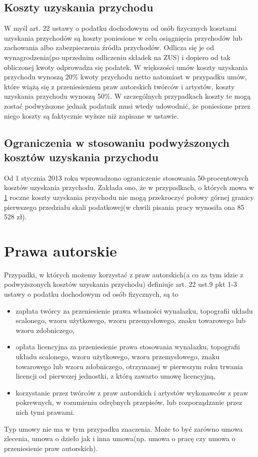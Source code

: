 \subsection[Koszty uzyskania przychodu][Koszty uzyskania przychodu]{Koszty uzyskania przychodu}
W myśl art. 22 ustawy o podatku dochodowym od osób fizycznych\cite{TODO} kosztami uzyskania przychodów są koszty poniesione w celu osiągnięcia przychodów lub zachowania albo zabezpieczenia źródła przychodów. Odlicza się je od wynagrodzenia(po uprzednim odliczeniu składek na ZUS) i dopiero od tak obliczonej kwoty odprowadza się podatek. W większości umów koszty uzyskania przychodu wynoszą 20\% kwoty przychodu netto natomiast w przypadku umów, które wiążą się z przeniesieniem praw autorskich twórców i artystów, koszty uzyskania przychodu wynoszą 50\%. W szczególnych przypadkach koszty te mogą zostać podwyższone jednak podatnik musi wtedy udowodnić, że poniesione przez niego koszty są faktycznie wyższe niż zapisane w ustawie.

\subsection[Ograniczenia w stosowaniu podwyższonych kosztów uzyskania przychodu][Ograniczenia w stosowaniu podwyższonych kosztów uzyskania przychodu]{Ograniczenia w stosowaniu podwyższonych kosztów uzyskania przychodu}
Od 1 stycznia 2013 roku wprowadzono ograniczenie stosowania 50-procentowych kosztów uzyskania przychodu. Zakłada ono, że  w przypadkach, o których mowa w \ref{prawaAutorskie} roczne koszty uzyskania przychodu nie mogą przekroczyć połowy górnej granicy pierwszego przedziału skali podatkowej(w chwili pisania pracy wynosiła ona 85 528 zł).

\section[Prawa autorskie][Prawa autorskie]{Prawa autorskie}
\label{prawaAutorskie}
Przypadki, w których możemy korzystać z praw autorskich(a co za tym idzie z podwyższonych kosztów uzyskania przychodu) definiuje art. 22 ust.9 pkt 1-3 ustawy o podatku dochodowym od osób fizycznych\cite{TODO}, są to
\begin{itemize}
	\item  zapłata twórcy za przeniesienie prawa własności wynalazku, topografii układu scalonego, wzoru użytkowego, wzoru przemysłowego, znaku towarowego lub wzoru zdobniczego,
	\item opłata licencyjna za przeniesienie prawa stosowania wynalazku, topografii układu scalonego, wzoru użytkowego, wzoru przemysłowego, znaku towarowego lub wzoru zdobniczego, otrzymanej w pierwszym roku trwania licencji od pierwszej jednostki, z którą zawarto umowę licencyjną,
	\item korzystanie przez twórców z praw autorskich i artystów wykonawców z praw pokrewnych, w rozumieniu odrębnych przepisów, lub rozporządzanie przez nich tymi prawami.
\end{itemize}
Typ umowy nie ma w tym przypadku znaczenia. Może to być zarówno umowa zlecenia, umowa o dzieło jak i inna umowa(np. umowa o pracę czy umowa o przeniesienie praw autorskich).

